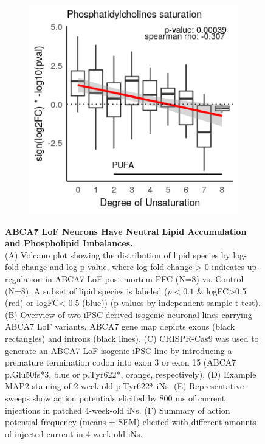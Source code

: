 \begin{figure}[ht]
\begin{subfigure}[t]{.24\textwidth}
    \end{subfigure} 
    \begin{subfigure}[t]{.24\textwidth}
        \caption{}
        \includegraphics[width=\textwidth]{./main_plots/PC_saturation.png}        
    \end{subfigure} 
    \caption{
        \textbf{ABCA7 LoF Neurons Have Neutral Lipid Accumulation and Phospholipid Imbalances.}\\[1ex]
        (A) Volcano plot showing the distribution of lipid species by log-fold-change and log-p-value, where log-fold-change > 0 indicates up-regulation in ABCA7 LoF post-mortem PFC (N=8) vs. Control (N=8). A subset of lipid species is labeled ($p<0.1$ \& logFC>0.5 (red) or logFC<-0.5 (blue)) (p-values by independent sample t-test). 
        (B) Overview of two iPSC-derived isogenic neuronal lines carrying ABCA7 LoF variants. ABCA7 gene map depicts exons (black rectangles) and introns (black lines). 
        (C) CRISPR-Cas9 was used to generate an ABCA7 LoF isogenic iPSC line by introducing a premature termination codon into exon 3 or exon 15 (ABCA7 p.Glu50fs*3, blue or p.Tyr622*, orange, respectively). 
        (D) Example MAP2 staining of 2-week-old p.Tyr622* iNs. 
        (E) Representative sweeps show action potentials elicited by 800 ms of current injections in patched 4-week-old iNs. 
        (F) Summary of action potential frequency (means ± SEM) elicited with different amounts of injected current in 4-week-old iNs. 
}
\end{figure}
